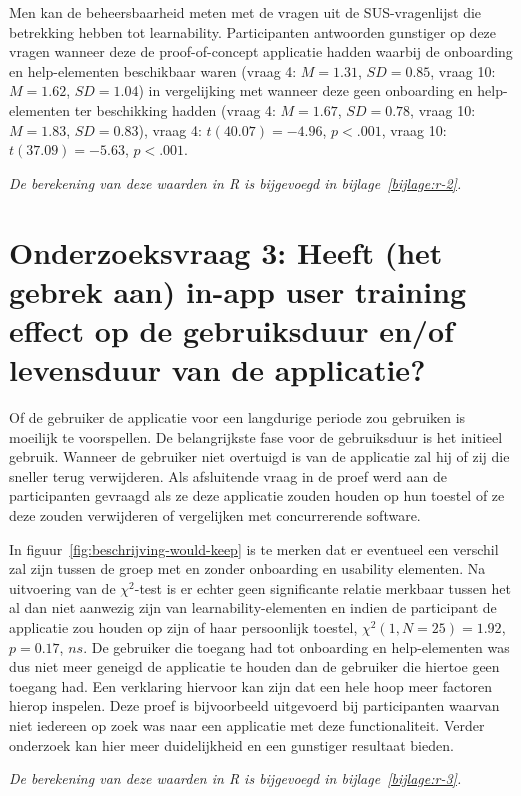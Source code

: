 Men kan de beheersbaarheid meten met de vragen uit de SUS-vragenlijst die betrekking hebben tot learnability. Participanten antwoorden gunstiger op deze vragen wanneer deze de proof-of-concept applicatie hadden waarbij de onboarding en help-elementen beschikbaar waren (vraag 4: $M = 1.31$, $SD = 0.85$, vraag 10: $M = 1.62$, $SD = 1.04$) in vergelijking met wanneer deze geen onboarding en help-elementen ter beschikking hadden (vraag 4: $M = 1.67$, $SD = 0.78$, vraag 10: $M = 1.83$, $SD = 0.83$), vraag 4: $t(40.07) = -4.96$, $p < .001$, vraag 10: $t(37.09) = -5.63$, $p < .001$.

\textit{De berekening van deze waarden in R is bijgevoegd in bijlage~\ref{bijlage:r-2}.}

\section[Onderzoeksvraag 3]{Onderzoeksvraag 3: Heeft (het gebrek aan) in-app user training effect op de gebruiksduur en/of levensduur van de applicatie?}
\label{sec:onderzoeksvraag-3}

Of de gebruiker de applicatie voor een langdurige periode zou gebruiken is moeilijk te voorspellen. De belangrijkste fase voor de gebruiksduur is het initieel gebruik. Wanneer de gebruiker niet overtuigd is van de applicatie zal hij of zij die sneller terug verwijderen. Als afsluitende vraag in de proef werd aan de participanten gevraagd als ze deze applicatie zouden houden op hun toestel of ze deze zouden verwijderen of vergelijken met concurrerende software.

In figuur~\ref{fig:beschrijving-would-keep} is te merken dat er eventueel een verschil zal zijn tussen de groep met en zonder onboarding en usability elementen. Na uitvoering van de $\chi^2$-test is er echter geen significante relatie merkbaar tussen het al dan niet aanwezig zijn van learnability-elementen en indien de participant de applicatie zou houden op zijn of haar persoonlijk toestel, $\chi^2 (1, N = 25) = 1.92$, $p = 0.17$, $ns$. De gebruiker die toegang had tot onboarding en help-elementen was dus niet meer geneigd de applicatie te houden dan de gebruiker die hiertoe geen toegang had. Een verklaring hiervoor kan zijn dat een hele hoop meer factoren hierop inspelen. Deze proef is bijvoorbeeld uitgevoerd bij participanten waarvan niet iedereen op zoek was naar een applicatie met deze functionaliteit. Verder onderzoek kan hier meer duidelijkheid en een gunstiger resultaat bieden.

\textit{De berekening van deze waarden in R is bijgevoegd in bijlage~\ref{bijlage:r-3}.}

